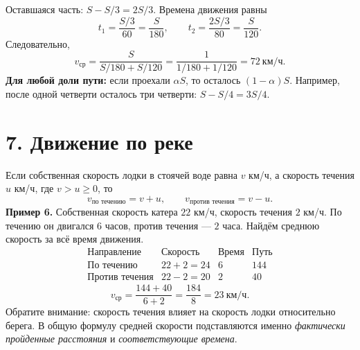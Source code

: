 \documentclass[a4paper,12pt]{article}
\newcommand{\key}[1]{\textcolor{darkaccent}{\textbf{#1}}}
\begin{document}
\begin{center}
\end{center}
Оставшаяся часть: $S-S/3=2S/3$. Времена движения равны
\[
t_1=\frac{S/3}{60}=\frac{S}{180},\qquad
t_2=\frac{2S/3}{80}=\frac{S}{120}.
\]
Следовательно,
\[
v_{\text{ср}}=\frac{S}{S/180+S/120}
=\frac{1}{1/180+1/120}=\boxed{72\ \text{км/ч}}.
\]
\key{Для любой доли пути:} если проехали $\alpha S$, то осталось $(1-\alpha)S$. Например, после одной четверти осталось три четверти: $S-S/4=3S/4$.

\clearpage
\section*{7. Движение по реке}
Если собственная скорость лодки в стоячей воде равна $v$ км/ч, а скорость течения $u$ км/ч, где $v>u\ge0$, то
\[
\boxed{v_{\text{по течению}}=v+u,\qquad v_{\text{против течения}}=v-u.}
\]
\textbf{Пример 6.} Собственная скорость катера $22$ км/ч, скорость течения $2$ км/ч. По течению он двигался $6$ часов, против течения --- $2$ часа. Найдём среднюю скорость за всё время движения.
\[
\begin{array}{c|c|c|c}
\text{Направление}&\text{Скорость}&\text{Время}&\text{Путь}\\ \hline
\text{По течению}&22+2=24&6&144\\
\text{Против течения}&22-2=20&2&40
\end{array}
\]
\[
v_{\text{ср}}=\frac{144+40}{6+2}=\frac{184}{8}=\boxed{23\ \text{км/ч}}.
\]
Обратите внимание: скорость течения влияет на скорость лодки относительно берега. В общую формулу средней скорости подставляются именно \emph{фактически пройденные расстояния} и \emph{соответствующие времена}.
\end{document}
